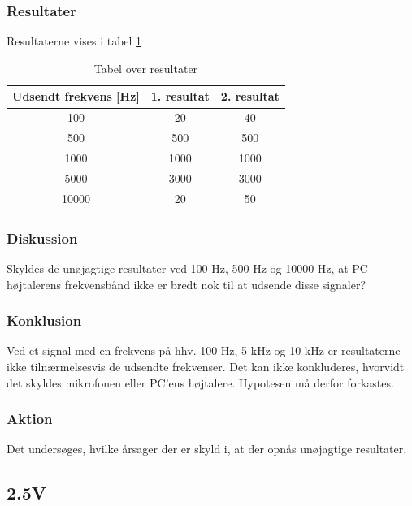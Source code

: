 		\subsubsection{Resultater}
		Resultaterne vises i tabel \ref{E06 resultater}
		\begin{table}[]
				\centering
				\caption{Tabel over resultater}
				\label{E06 resultater}
				\begin{tabular}{ccc}
					\multicolumn{1}{c|}{\textbf{Udsendt frekvens {[}Hz{]}}} & 	
					\multicolumn{1}{c|}{\textbf{1. resultat}} & \textbf{2. resultat} \\ \hline
					\multicolumn{1}{c|}{100}& 
					\multicolumn{1}{c|}{20}&40\\
					\multicolumn{1}{c|}{500}& 
					\multicolumn{1}{c|}{500}&500\\
					\multicolumn{1}{c|}{1000}& 
					\multicolumn{1}{c|}{1000}&1000\\
					\multicolumn{1}{c|}{5000}& 
					\multicolumn{1}{c|}{3000}&3000\\
					\multicolumn{1}{c|}{10000}& 
					\multicolumn{1}{c|}{20}&50\\
                   
				\end{tabular}
			\end{table}
		
		\subsubsection{Diskussion} 
		Skyldes de unøjagtige resultater ved 100 Hz, 500 Hz og 10000 Hz, at PC højtalerens frekvensbånd ikke er bredt nok til at udsende disse signaler?
		 \subsubsection{Konklusion}
	Ved et signal med en frekvens på hhv. 100 Hz, 5 kHz og 10 kHz er resultaterne ikke tilnærmelsesvis de udsendte frekvenser. 
	Det kan ikke konkluderes, hvorvidt det skyldes mikrofonen eller PC'ens højtalere. Hypotesen må derfor forkastes.  
		\subsubsection{Aktion}
		Det undersøges, hvilke årsager der er skyld i, at der opnås unøjagtige resultater.  
		
		
\subsection{\elektretto 2.5V}
